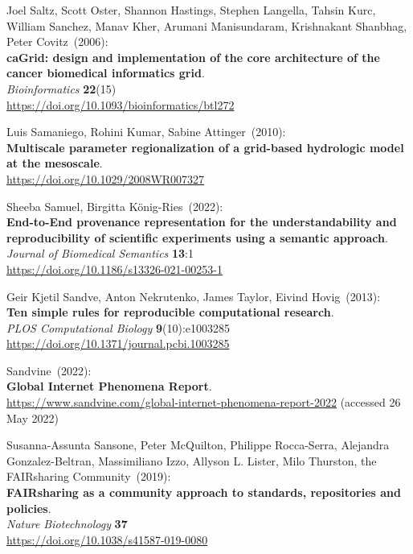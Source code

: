\begin{thebibliography}{9}
Joel Saltz, Scott Oster, Shannon Hastings, Stephen Langella, Tahsin Kurc, William Sanchez, Manav Kher, Arumani Manisundaram, Krishnakant Shanbhag, Peter Covitz~(2006): \\
\textbf{caGrid: design and implementation of the core architecture of the cancer biomedical informatics grid}.\\
\emph{Bioinformatics}
\textbf{22}(15) \\
\url{https://doi.org/10.1093/bioinformatics/btl272}

Luis Samaniego, Rohini Kumar, Sabine Attinger~(2010): \\
\textbf{Multiscale parameter regionalization of a grid-based hydrologic model at the mesoscale}.\\
\url{https://doi.org/10.1029/2008WR007327}

 Sheeba Samuel, Birgitta König-Ries~(2022): \\
\textbf{End-to-End provenance representation for the understandability and reproducibility of scientific experiments using a semantic approach}. \\
\emph{Journal of Biomedical Semantics} \textbf{13}:1 \\
\url{https://doi.org/10.1186/s13326-021-00253-1}

Geir Kjetil Sandve, Anton Nekrutenko, James Taylor, Eivind Hovig~(2013): \\
\textbf{Ten simple rules for reproducible computational research}.\\
\emph{PLOS Computational Biology} \textbf{9}(10):e1003285\\
\url{https://doi.org/10.1371/journal.pcbi.1003285}

Sandvine~(2022): \\
\textbf{Global Internet Phenomena Report}.\\
\url{https://www.sandvine.com/global-internet-phenomena-report-2022}
(accessed 26 May 2022)

Susanna-Assunta Sansone, Peter McQuilton, Philippe Rocca-Serra, Alejandra Gonzalez-Beltran, Massimiliano Izzo, Allyson L. Lister, Milo Thurston, the FAIRsharing Community~(2019):\\
\textbf{FAIRsharing as a community approach to standards, repositories and policies}.\\
\emph{Nature Biotechnology} \textbf{37} \\
\url{https://doi.org/10.1038/s41587-019-0080}


\end{thebibliography}

